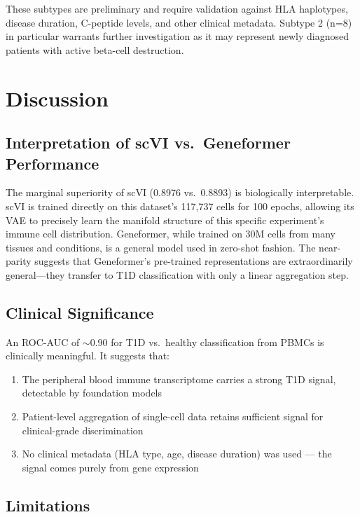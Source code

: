 These subtypes are preliminary and require validation against HLA haplotypes, disease duration, C-peptide levels, and other clinical metadata. Subtype 2 (n=8) in particular warrants further investigation as it may represent newly diagnosed patients with active beta-cell destruction.

\section{Discussion}

\subsection{Interpretation of scVI vs.\ Geneformer Performance}

The marginal superiority of scVI (0.8976 vs.\ 0.8893) is biologically interpretable. scVI is trained directly on this dataset's 117,737 cells for 100 epochs, allowing its VAE to precisely learn the manifold structure of this specific experiment's immune cell distribution. Geneformer, while trained on 30M cells from many tissues and conditions, is a general model used in zero-shot fashion. The near-parity suggests that Geneformer's pre-trained representations are extraordinarily general---they transfer to T1D classification with only a linear aggregation step.

\subsection{Clinical Significance}

An ROC-AUC of $\sim$0.90 for T1D vs.\ healthy classification from PBMCs is clinically meaningful. It suggests that:

\begin{enumerate}
    \item The peripheral blood immune transcriptome carries a strong T1D signal, detectable by foundation models
    \item Patient-level aggregation of single-cell data retains sufficient signal for clinical-grade discrimination
    \item No clinical metadata (HLA type, age, disease duration) was used --- the signal comes purely from gene expression
\end{enumerate}

\subsection{Limitations}

